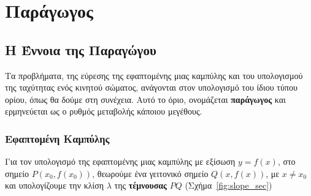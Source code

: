 \chapter*{Παράγωγος}


\section*{Η Έννοια της Παραγώγου}

Τα προβλήματα, της εύρεσης της εφαπτομένης μιας καμπύλης και του υπολογισμού της 
ταχύτητας ενός κινητού σώματος, ανάγονται στον υπολογισμό του ίδιου τύπου ορίου, 
όπως θα δούμε στη συνέχεια. Αυτό το όριο, ονομάζεται \textbf{παράγωγος} και ερμηνεύεται 
ως ο ρυθμός μεταβολής κάποιου μεγέθους.

\subsection*{Εφαπτομένη Καμπύλης}

Για τον υπολογισμό της εφαπτομένης μιας καμπύλης με εξίσωση $ y=f(x) $, στο 
σημείο $P( x_{0}, f(x_{0})) $, θεωρούμε ένα γειτονικό σημείο $ Q(x,f(x)) $, με 
$ x \neq x_{0} $ και υπολογίζουμε την κλίση $\lambda$ της \textbf{τέμνουσας} $ PQ $
(Σχήμα~\ref{fig:slope_sec})


